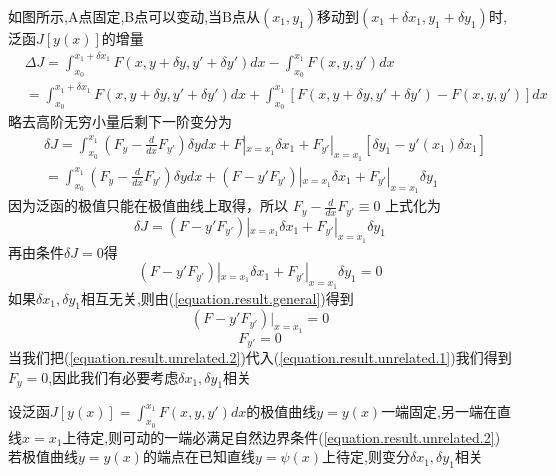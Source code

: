 如图所示,A点固定,B点可以变动,当B点从$(x_1,y_1)$移动到$(x_1+\delta x_1,y_1+\delta y_1)$时,泛函$ J[y(x)]$的增量
\begin{equation}
     \begin{split}
         & \Delta J=\int_{x_0}^{x_1+\delta x_1}F(x,y+\delta y,y'+\delta y')dx-\int_{x_0}^{x_1}F(x,y,y')dx\\
         & =\int_{x_0}^{x_1+\delta x_1}F(x,y+\delta y,y'+\delta y')dx+\int_{x_0}^{x_1}[F(x,y+\delta y,y'+\delta y')-F(x,y,y')]dx
     \end{split}
\end{equation}
略去高阶无穷小量后剩下一阶变分为
\begin{equation}
\begin{split}
     &  \delta J=\int_{x_0}^{x_1}(F_y - \frac{d}{dx}F_{y'} )\delta y dx + F|_{x=x_1}\delta x_1 + F_{y'}|_{x=x_1}[\delta y_1 - y'(x_1)\delta x_1] \\
    & =\int_{x_0}^{x_1}(F_y - \frac{d}{dx}F_{y'} )\delta y dx + (F-y'F_{y'})|_{x=x_1}\delta x_1 +F_{y'}|_{x=x_1}\delta y_1
\end{split}
\end{equation}
因为泛函的极值只能在极值曲线上取得，所以
$F_y - \frac{d}{dx}F_{y'} \equiv0$
上式化为
\begin{equation}
     \delta J=(F-y'F_{y'})|_{x=x_1}\delta x_1 +F_{y'}|_{x=x_1}\delta y_1
\end{equation}
再由条件$\delta J=0$得
\begin{equation}
     (F-y'F_{y'})|_{x=x_1}\delta x_1 +F_{y'}|_{x=x_1}\delta y_1=0
     \label{equation.result.general}
\end{equation}
如果$\delta x_1,\delta y_1$相互无关,则由(\ref{equation.result.general})得到
\begin{equation}
(F-y'F_{y'})|_{x=x_1}=0
\label{equation.result.unrelated.1}
\end{equation}
\begin{equation}
F_{y'}=0
\label{equation.result.unrelated.2}
\end{equation}
当我们把(\ref{equation.result.unrelated.2})代入(\ref{equation.result.unrelated.1})我们得到$F_y=0$,因此我们有必要考虑$\delta x_1,\delta y_1$相关
\begin{theorem}
设泛函$J[y(x)]=\int_{x_0}^{x_1}F(x,y,y')dx$的极值曲线$y=y(x)$一端固定,另一端在直线$x=x_1$上待定,则可动的一端必满足自然边界条件(\ref{equation.result.unrelated.2})
若极值曲线$y=y(x)$的端点在已知直线$y=\psi(x)$上待定,则变分$\delta x_1,\delta y_1$相关
\end{theorem}

